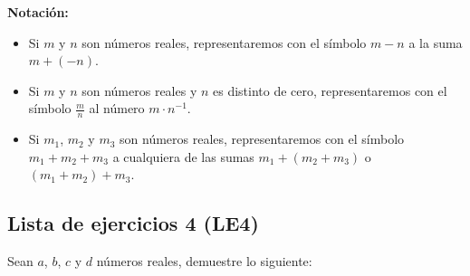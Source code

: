\documentclass[11pt]{article}
\begin{document}
\textbf{Notación:}

\begin{itemize}
    \item Si $m$ y $n$ son números reales, representaremos con el símbolo $m-n$ a la suma $m+ (-n)$.
    \item Si $m$ y $n$ son números reales y $n$ es distinto de cero, representaremos con el símbolo $ \frac{m}{n}$ al número $m \cdot n^{-1} $.
    \item Si $m_1$, $m_2$ y $m_3$ son números reales, representaremos con el símbolo $m_1+m_2+ m_3$ a cualquiera de las sumas $m_1+ \left(m_2+ m_3 \right)$ o $\left(m_1+ m_2 \right)+ m_3$.
\end{itemize}

\subsection*{Lista de ejercicios 4 (LE4)}

Sean $a$, $b$, $c$ y $d$ números reales, demuestre lo siguiente:
\end{document}
